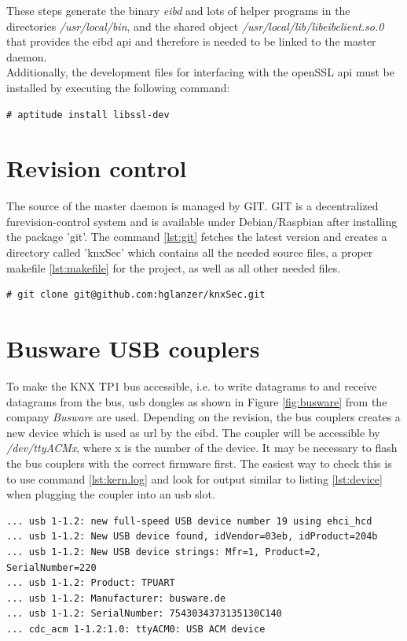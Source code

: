 These steps generate the binary \textit{eibd} and lots of helper programs in the directories \textit{/usr/local/bin}, and the shared object
\textit{/usr/local/lib/libeibclient.so.0} that provides the \gls{eibd} \gls{api} and therefore is needed to be linked to the master daemon.
\\
Additionally, the development files for interfacing with the openSSL \gls{api} must be installed by executing the following command:
\begin{lstlisting}[style=BashInputStyle]
 # aptitude install libssl-dev
\end{lstlisting}

\section{Revision control}

The source of the master daemon is managed by GIT. GIT is a decentralized furevision-control system and is available under Debian/Raspbian after installing
the package 'git'. The command \ref{lst:git} fetches the latest version and creates a directory called 'knxSec' which contains all the needed source files,
a proper makefile \ref{lst:makefile} for the project, as well as all other needed files.

\begin{lstlisting}[style=BashInputStyle,label=lst:git]
    # git clone git@github.com:hglanzer/knxSec.git
\end{lstlisting}

\section{Busware USB couplers}

To make the KNX TP1 bus accessible, i.e. to write datagrams to and receive datagrams from the bus, \gls{usb} dongles as shown in Figure \ref{fig:busware}
from the company \textit{Busware} are used. Depending on the revision, the bus couplers creates a new device which is used as \gls{url} by the \gls{eibd}.
The coupler will be accessible by \textit{/dev/ttyACMx}, where x is the number of the device. It may be necessary to flash the bus couplers with the correct
firmware first. The easiest way to check this is to use command \ref{lst:kern.log} and look for output similar to listing \ref{lst:device} when plugging 
the coupler into an \gls{usb} slot.

\begin{lstlisting}[style=BashInputStyle,label=lst:device]
... usb 1-1.2: new full-speed USB device number 19 using ehci_hcd
... usb 1-1.2: New USB device found, idVendor=03eb, idProduct=204b
... usb 1-1.2: New USB device strings: Mfr=1, Product=2, SerialNumber=220
... usb 1-1.2: Product: TPUART
... usb 1-1.2: Manufacturer: busware.de
... usb 1-1.2: SerialNumber: 7543034373135130C140
... cdc_acm 1-1.2:1.0: ttyACM0: USB ACM device
\end{lstlisting}

